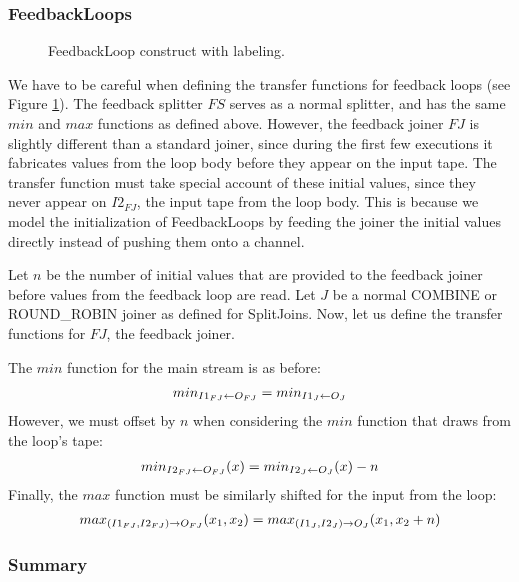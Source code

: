 \subsubsection{FeedbackLoops}

\begin{figure}
\centering
{}
\caption{\protect\small  FeedbackLoop construct with labeling.
\protect\label{looplabel}}
\end{figure}

We have to be careful when defining the transfer functions for
feedback loops (see Figure \ref{looplabel}).  The feedback splitter
$FS$ serves as a normal splitter, and has the same $min$ and $max$
functions as defined above.  However, the feedback joiner $FJ$ is
slightly different than a standard joiner, since during the first few
executions it fabricates values from the loop body before they appear
on the input tape.  The transfer function must take special account of
these initial values, since they never appear on $I2_{FJ}$, the input
tape from the loop body.  This is because we model the initialization
of FeedbackLoops by feeding the joiner the initial values directly
instead of pushing them onto a channel.

Let $n$ be the number of initial values that are provided to the
feedback joiner before values from the feedback loop are read.  Let
$J$ be a normal COMBINE or ROUND\_ROBIN joiner as defined for
SplitJoins.  Now, let us define the transfer functions for $FJ$, the
feedback joiner.

The $min$ function for the main stream is as before:
\begin{align*}
min_{I1_{FJ} \leftarrow O_{FJ}} = min_{I1_J \leftarrow O_J} 
\end{align*}
However, we must offset by $n$ when considering the $min$ function
that draws from the loop's tape:
\begin{align*}
min_{I2_{FJ} \leftarrow O_{FJ}}(x) = min_{I2_J \leftarrow O_J}(x) - n
\end{align*}
Finally, the $max$ function must be similarly shifted for the input
from the loop:
\begin{align*}
max_{(I1_{FJ}, I2_{FJ}) \rightarrow O_{FJ}}(x_1, x_2) = max_{(I1_J, I2_J) \rightarrow O_J}(x_1,
x_2 + n)
\end{align*}

\subsubsection{Summary}

